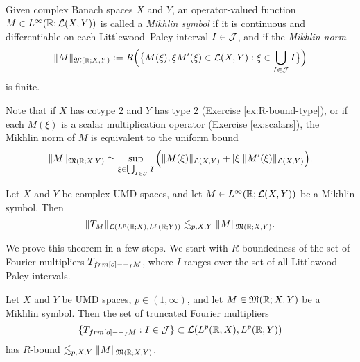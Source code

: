 \begin{defn}
  Given complex Banach spaces $X$ and $Y$, an operator-valued function $M \in L^\infty(\mathbb{R}; \mathcal{L}(X,Y))$ is called a \emph{Mikhlin symbol} if it is continuous and differentiable on each Littlewood--Paley interval $I \in \mathcal{J}$, and if the \emph{Mikhlin norm}
  \begin{equation*}
    \|M\|_{\mathfrak{M}(\mathbb{R};X,Y)} := R \Big( \big\{ M(\xi), \xi M'(\xi) \in \mathcal{L}(X,Y) : \xi \in \bigcup_{I \in \mathcal{J}} I \big\} \Big)
  \end{equation*}
  is finite.
\end{defn}

Note that if $X$ has cotype $2$ and $Y$ has type $2$ (Exercise \ref{ex:R-bound-type}), or if each $M(\xi)$ is a scalar multiplication operator (Exercise \ref{ex:scalars}), the Mikhlin norm of $M$ is equivalent to the uniform bound
\begin{equation*}
  \|M\|_{\mathfrak{M}(\mathbb{R};X,Y)} \simeq \sup_{\xi \in \bigcup_{I \in \mathcal{J}} I} \Big( \|M(\xi)\|_{\mathcal{L}(X,Y)} + |\xi|\|M'(\xi)\|_{\mathcal{L}(X,Y)} \Big).
\end{equation*}


\begin{thm}\label{thm:Mikhlin}
  Let $X$ and $Y$ be complex UMD spaces, and let $M \in L^\infty(\mathbb{R};\mathcal{L}(X,Y))$ be a Mikhlin symbol.
  Then
  \begin{equation*}
    \|T_{M}\|_{\mathcal{L}(L^p(\mathbb{R};X), L^p(\mathbb{R};Y))} \lesssim_{p,X,Y} \|M\|_{\mathfrak{M}(\mathbb{R};X,Y)}.
  \end{equation*}
\end{thm}

We prove this theorem in a few steps.
We start with $R$-boundedness of the set of Fourier multipliers $T_{\1_{I} M}$, where $I$ ranges over the set of all Littlewood--Paley intervals.

\begin{lem}\label{lem:Mikhlin-components-R}
  Let $X$ and $Y$ be UMD spaces, $p \in (1,\infty)$, and let $M \in \mathfrak{M}(\mathbb{R};X,Y)$ be a Mikhlin symbol.
  Then the set of truncated Fourier multipliers
  \begin{equation*}
    \{T_{\1_{I} M} : I \in \mc{J}\} \subset \Lin(L^p(\R;X), L^p(\R;Y))
  \end{equation*}
  has $R$-bound $\lesssim_{p,X,Y} \|M\|_{\mathfrak{M}(\mathbb{R};X,Y)}$.
\end{lem}

